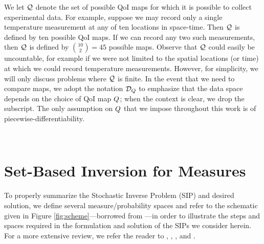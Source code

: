 We let $\mathcal{Q}$ denote the set of possible QoI maps for which it is possible to collect experimental data.
For example, suppose we may record only a single temperature measurement at any of ten locations in space-time.
Then $\mathcal{Q}$ is defined by ten possible QoI maps. 
If we can record any two such measurements, then $\mathcal{Q}$ is defined by $\binom{10}{2} = 45$ possible maps.
Observe that $\mathcal{Q}$ could easily be uncountable, for example if we were not limited to the spatial locations (or time) at which we could record temperature measurements.
However, for simplicity, we will only discuss problems where $\mathcal{Q}$ is finite.
In the event that we need to compare maps, we adopt the notation $\mathcal{D}_{Q}$ to emphasize that the data space depends on the choice of QoI map $Q$; when the context is clear, we drop the subscript.
The only assumption on $Q$ that we impose throughout this work is of piecewise-differentiability.

%

\
\section{Set-Based Inversion for Measures}

To properly summarize the Stochastic Inverse Problem (SIP) and desired solution, we define several measure/probability spaces and refer to the schematic given in Figure \ref{fig:scheme}\----borrowed from \cite{BM17}\----in order to illustrate the steps and spaces required in the formulation and solution of the SIPs we consider herein.
For a more extensive review, we refer the reader to \cite{BBE11}, \cite{BES12}, \cite{BET+14}, and \cite{BM17}. 

